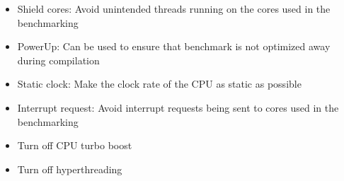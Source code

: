 \begin{itemize}
    \item Shield cores: Avoid unintended threads running on the cores used in the benchmarking
    \item PowerUp: Can be used to ensure that benchmark is not optimized away during compilation
    \item Static clock: Make the clock rate  of the CPU as static as possible
    \item Interrupt request: Avoid interrupt requests being sent to cores used in the benchmarking 
    \item Turn off CPU turbo boost
    \item Turn off hyperthreading
\end{itemize}